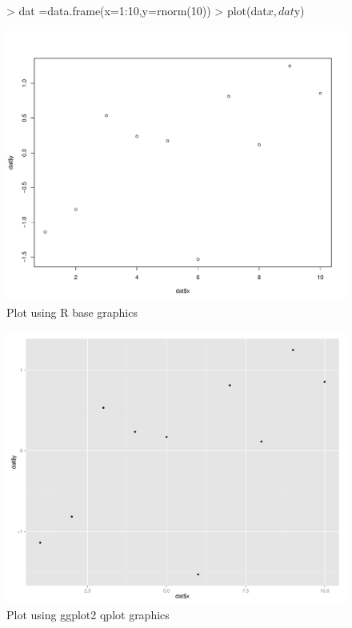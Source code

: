 \documentclass[shortnames,nojss,article]{jss}
\begin{document}
\begin{figure}
\begin{Schunk}
\begin{Sinput}
> dat =data.frame(x=1:10,y=rnorm(10))
> plot(dat$x,dat$y)
\end{Sinput}
\end{Schunk}
\includegraphics{diags-fig1}
\caption{Plot using R base graphics} 
\end{figure}

\begin{figure}
\includegraphics{diags-fig2}
\caption{Plot using ggplot2 qplot graphics} 
\end{figure}
\end{document}
